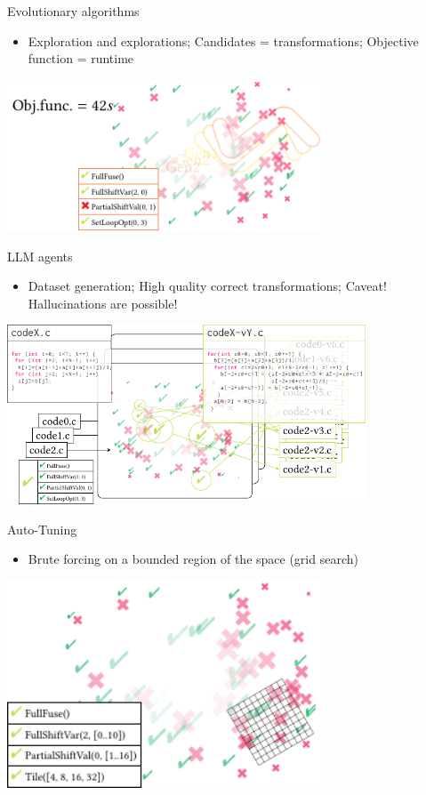 \documentclass[presentation, aspectratio=169]{beamer}
\begin{document}
\begin{frame}[label={sec:orgd516121}]{Evolutionary algorithms}
\begin{itemize}
\item Exploration and explorations; Candidates = transformations; Objective function = runtime
\end{itemize}
\begin{center}
\includegraphics[width=0.7\textwidth]{./figs/ml-ea.pdf}
\end{center}
\end{frame}
\begin{frame}[label={sec:org405e45d}]{LLM agents}
\begin{itemize}
\item Dataset generation; High quality correct transformations; Caveat! Hallucinations are possible!
\end{itemize}
\begin{center}
\includegraphics[width=0.8\textwidth]{./figs/ml-ul.pdf}
\end{center}
\end{frame}
\begin{frame}[label={sec:orgf0da3c4}]{Auto-Tuning}
\begin{itemize}
\item Brute forcing on a bounded region of the space (grid search)
\end{itemize}
\begin{center}
\includegraphics[width=0.7\textwidth]{./figs/ml-at.pdf}
\end{center}
\end{frame}
\end{document}
